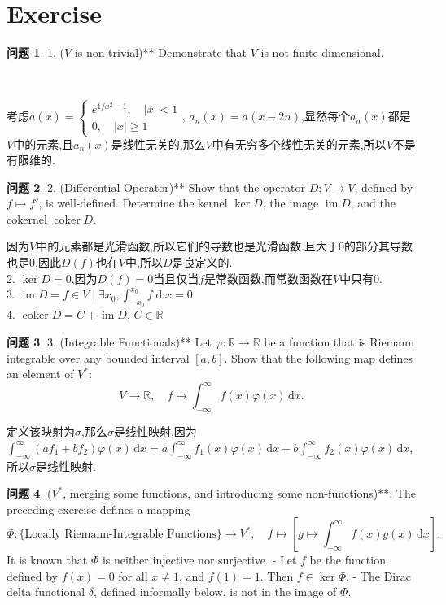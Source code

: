 \documentclass[11pt]{ctexart}
\theoremstyle{definition}
\newtheorem{qqq}{问题}[section]
\numberwithin{equation}{section}
\newcommand{\op}[1]{\operatorname{#1}}%
\newcommand{\RR}{\mathbb{R}}
\theoremstyle{definition}
\theoremstyle{remark}
\begin{document}
\section{Exercise}
\begin{qqq}
    1. ($V$ is non-trivial)** Demonstrate that $V$ is not finite-dimensional. 
\end{qqq}\
\begin{aaa}
    考虑$a(x)=\begin{cases}
    e^{1/x^2-1}, \quad |x|<1 \\
    0, \quad |x|\geq1
    \end{cases}$,
    $a_n(x)=a(x-2n)$,显然每个$a_n(x)$都是$V$中的元素,且$a_n(x)$是线性无关的,那么$V$中有无穷多个线性无关的元素,所以$V$不是有限维的.
\end{aaa}
\begin{qqq}
    2. (Differential Operator)** Show that the operator $D: V \to V$, defined by $f \mapsto f'$, is well-defined. Determine the kernel $\ker D$, the image $\operatorname{im} D$, and the cokernel $\operatorname{coker} D$.
\end{qqq}
\begin{aaa}
    因为$V$中的元素都是光滑函数,所以它们的导数也是光滑函数.且大于0的部分其导数也是0,因此$D(f)$也在$V$中,所以$D$是良定义的.\\
    2. $\ker D=0$,因为$D(f)=0$当且仅当$f$是常数函数,而常数函数在$V$中只有0.\\
    3. $\operatorname{im} D={f \in V\mid \exists x_0,\int _{-x_0}^{x_0} f \op{d}x=0 }$\\
    4. $\operatorname{coker} D= C+\op{im} D$, $C\in \RR$
\end{aaa}
\begin{qqq}
    3. (Integrable Functionals)** Let $\varphi: \mathbb{R} \to \mathbb{R}$ be a function that is Riemann integrable over any bounded interval $[a,b]$. Show that the following map defines an element of $V^\ast$:
$$
V \to \mathbb{R}, \quad f \mapsto \int_{-\infty}^{\infty} f(x)\varphi(x)\, \mathrm{d}x.
$$
\end{qqq}
\begin{aaa}
    定义该映射为$\sigma$,那么$\sigma$是线性映射,因为$\int_{-\infty}^{\infty} (af_1+bf_2)\varphi(x)\, \mathrm{d}x=a\int_{-\infty}^{\infty} f_1(x)\varphi(x)\, \mathrm{d}x+b\int_{-\infty}^{\infty} f_2(x)\varphi(x)\, \mathrm{d}x$,所以$\sigma$是线性映射.\\
\end{aaa}
\begin{qqq}
    ($V^\ast$, merging some functions, and introducing some non-functions)**. The preceding exercise defines a mapping
$$
\Phi : \{\text{Locally Riemann-Integrable Functions}\} \to V^\ast, \quad f \mapsto \left[g \mapsto \int_{-\infty}^\infty f(x)g(x)\, \mathrm{d}x\right].
$$
It is known that $\Phi$ is neither injective nor surjective.  
- Let $f$ be the function defined by $f(x) = 0$ for all $x \neq 1$, and $f(1) = 1$. Then $f \in \ker \Phi$.  
- The Dirac delta functional $\delta$, defined informally below, is not in the image of $\Phi$.
\end{qqq}
\end{document}
